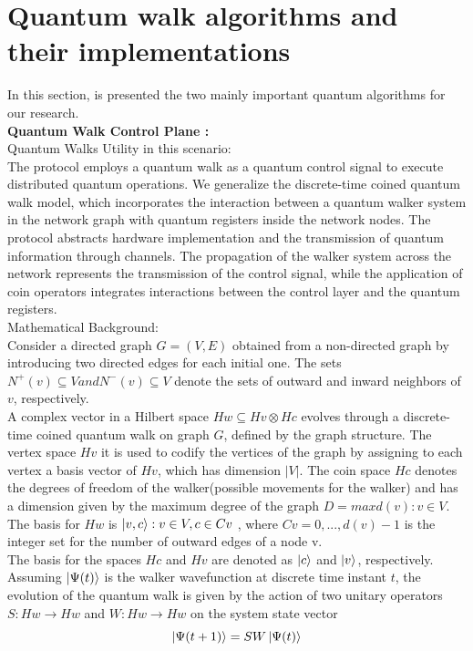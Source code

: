\documentclass{article}
\begin{document}
 
\section{Quantum walk algorithms and their implementations}
    
    In this section, is presented the two mainly important quantum algorithms for our research.\\
    
    \textbf{Quantum Walk Control Plane \cite{universalcontrolplane}:}\\
    
    Quantum Walks Utility in this scenario:\\
    
    The protocol employs a quantum walk as a quantum control signal to execute distributed quantum operations. We generalize the discrete-time coined quantum walk model, which incorporates the interaction between a quantum walker system in the network graph with quantum registers inside the network nodes. The protocol abstracts hardware implementation and the transmission of quantum information through channels. The propagation of the walker system across the network represents the transmission of the control signal, while the application of coin operators integrates interactions between the control layer and the quantum registers. \cite{controlplane}\\
    
    
    Mathematical Background:\\
    
    Consider a directed graph  $G = (V,E)$ obtained from a non-directed graph by introducing two directed edges for each initial one. The sets $N^{+}(v) \subseteq V and N^{-}(v) \subseteq V$ denote the sets of outward and inward neighbors of $v$, respectively.\\
    A complex vector in a Hilbert space $Hw \subseteq Hv \otimes Hc$  evolves through a discrete-time coined quantum walk on graph $G$, defined by the graph structure. The vertex space $Hv$ it is used to codify the vertices of the graph by assigning to each vertex a basis vector of $Hv$, which has dimension $|V|$. The coin space $Hc$ denotes the degrees of freedom of the walker(possible movements for the walker) and has a dimension given by the maximum degree of the graph $D = max{d(v): v \in V}$. The basis for $Hw$ is ${\ket{v,c} : v \in V, c \in Cv}$ , where $Cv = {0, ... , d(v) -1}$ is the integer set for the number of outward edges of a node v. \\
    The basis for the spaces $Hc$ and $Hv$ are denoted as ${\ket{c}}$ and ${\ket{v}}$, respectively. Assuming $\ket{\Psi(t)}$ is the walker wavefunction at discrete time instant $t$, the evolution of the quantum walk is given by the action of two unitary operators $S: Hw \to Hw$ and $W: Hw \to Hw$ on the system state vector $$\ket{\Psi(t+1)}= SW\ket{\Psi(t)}$$\cite{relationship}
    
\end{document}

